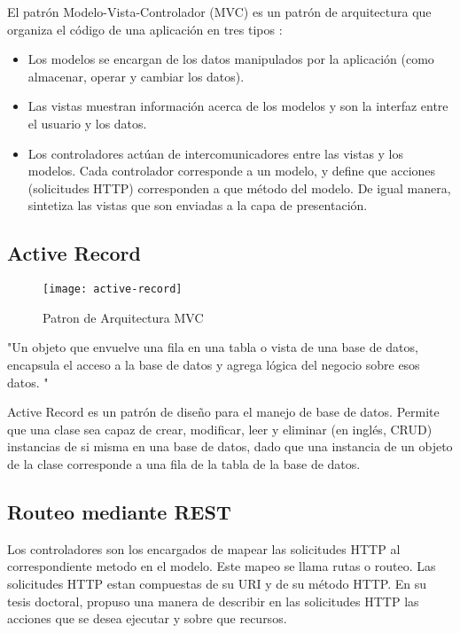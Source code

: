 El patrón Modelo-Vista-Controlador (MVC) es un patrón de arquitectura que organiza el código de una aplicación en tres tipos \cite{Fox2013-ct}:  
\begin{itemize}
    \item Los modelos se encargan de los datos manipulados por la aplicación (como almacenar, operar y cambiar los datos).
    \item Las vistas muestran información acerca de los modelos y son la interfaz entre el usuario y los datos. 
    \item Los controladores actúan de intercomunicadores entre las vistas y los modelos. Cada controlador corresponde a un modelo, y define que acciones (solicitudes HTTP) corresponden a que método del modelo. De igual manera, sintetiza las vistas que son enviadas a la capa de presentación.
\end{itemize}

\subsection{Active Record}
\begin{figure}[H]
        \centering
        \texttt{[image: active-record]}
        \caption{Patron de Arquitectura MVC \protect\cite{Fowler2012-az}}
        \label{fig:active-record}
    \end{figure}
\begin{displayquote}
"Un objeto que envuelve una fila en una tabla o vista de una base de datos, encapsula el acceso a la base de datos y agrega lógica del negocio sobre esos datos. "
\cite{Fowler2012-az}
\end{displayquote}
Active Record es un patrón de diseño para el manejo de base de datos. Permite que una clase sea capaz de crear, modificar, leer y eliminar (en inglés, CRUD) instancias de si misma en una base de datos, dado que una instancia de un objeto de la clase corresponde a una fila de la tabla de la base de datos.

\subsection{Routeo mediante REST}

Los controladores son los encargados de mapear las solicitudes HTTP al correspondiente metodo en el modelo. Este mapeo se llama rutas o routeo. Las solicitudes HTTP estan compuestas de su URI y de su método HTTP. En su tesis doctoral,  propuso una manera de describir en las solicitudes HTTP las acciones que se desea ejecutar y sobre que recursos.

